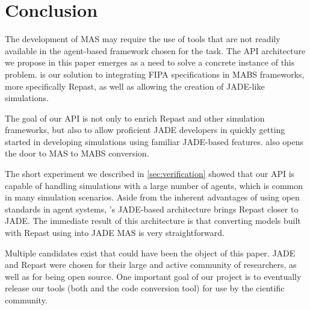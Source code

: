\section{Conclusion}
\label{sec:conclusion}

The development of MAS may require the use of tools that are not readily available in the agent-based framework chosen for the task. The API architecture we propose in this paper emerges as a need to solve a concrete instance of this problem. \apiname{} is our solution to integrating FIPA specifications in MABS frameworks, more specifically Repast, as well as allowing the creation of JADE-like simulations.

The goal of our API is not only to enrich Repast and other simulation frameworks, but also to allow proficient JADE developers in quickly getting started in developing simulations using familiar JADE-based features. \apiname{} also opens the door to MAS to MABS conversion.

The short experiment we described in \ref{sec:verification} showed that our API is capable of handling simulations with a large number of agents, which is common in many simulation scenarios. Aside from the inherent advantages of using open standards in agent systems, \apiname{}'s JADE-based architecture brings Repast closer to JADE. The immediate result of this architecture is that converting models built with Repast using \apiname{} into JADE MAS is very straightforward.

Multiple candidates exist that could have been the object of this paper. JADE and Repast were chosen for their large and active community of researchers, as well as for being open source. One important goal of our project is to eventually release our tools (both \apiname{} and the code conversion tool) for use by the cientific community.
